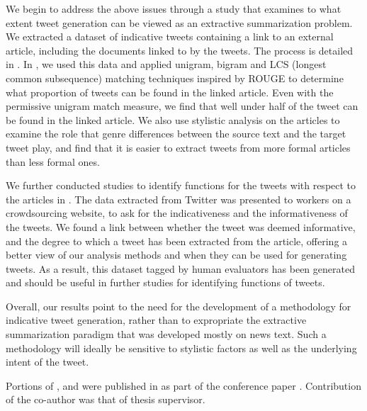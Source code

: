 We begin to address the above issues through a study that examines to what extent tweet generation can be viewed as an extractive summarization problem. We extracted a dataset of indicative tweets containing a link to an external article, including the documents linked to by the tweets. The process is detailed in . In , we used this data and applied unigram, bigram and LCS (longest common subsequence) matching techniques inspired by ROUGE to determine what proportion of tweets can be found in the linked article. Even with the permissive unigram match measure, we find that well under half of the tweet can be found in the linked article. We also use stylistic analysis on the articles to examine the role that genre differences between the source text and the target tweet play, and find that it is easier to extract tweets from more formal articles than less formal ones. 

We further conducted studies to identify functions for the tweets with respect to the articles in . The data extracted from Twitter was presented to workers on a crowdsourcing website, to ask for the indicativeness and the informativeness of the tweets. We found a link between whether the tweet was deemed informative, and the degree to which a tweet has been extracted from the article, offering a better view of our analysis methods and when they can be used for generating tweets. As a result, this dataset tagged by human evaluators has been generated and should be useful in further studies for identifying functions of tweets.

Overall, our results point to the need for the development of a methodology for indicative tweet generation, rather than to expropriate the extractive summarization paradigm that was developed mostly on news text. Such a methodology will ideally be sensitive to stylistic factors as well as the underlying intent of the tweet.

Portions of ,  and  were published in as part of the conference paper \cite{sidhayeindicative}. Contribution of the co-author was that of thesis supervisor. 
